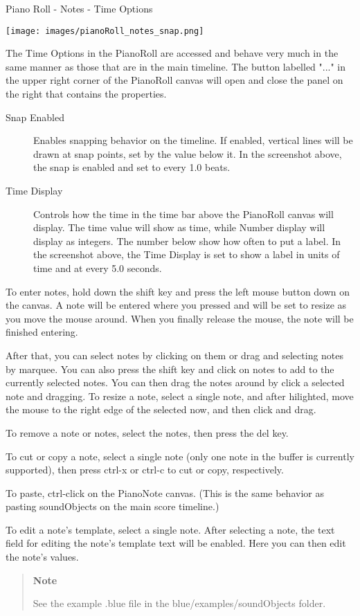 Piano Roll - Notes - Time Options

\texttt{[image: images/pianoRoll\_notes\_snap.png]}

The Time Options in the PianoRoll are accessed and behave very much in
the same manner as those that are in the main timeline. The button
labelled "..." in the upper right corner of the PianoRoll canvas will
open and close the panel on the right that contains the properties.

\begin{description}
\item[Snap Enabled]
Enables snapping behavior on the timeline. If enabled, vertical lines
will be drawn at snap points, set by the value below it. In the
screenshot above, the snap is enabled and set to every 1.0 beats.
\item[Time Display]
Controls how the time in the time bar above the PianoRoll canvas will
display. The time value will show as time, while Number display will
display as integers. The number below show how often to put a label. In
the screenshot above, the Time Display is set to show a label in units
of time and at every 5.0 seconds.
\end{description}

To enter notes, hold down the shift key and press the left mouse button
down on the canvas. A note will be entered where you pressed and will be
set to resize as you move the mouse around. When you finally release the
mouse, the note will be finished entering.

After that, you can select notes by clicking on them or drag and
selecting notes by marquee. You can also press the shift key and click
on notes to add to the currently selected notes. You can then drag the
notes around by click a selected note and dragging. To resize a note,
select a single note, and after hilighted, move the mouse to the right
edge of the selected now, and then click and drag.

To remove a note or notes, select the notes, then press the del key.

To cut or copy a note, select a single note (only one note in the buffer
is currently supported), then press ctrl-x or ctrl-c to cut or copy,
respectively.

To paste, ctrl-click on the PianoNote canvas. (This is the same behavior
as pasting soundObjects on the main score timeline.)

To edit a note's template, select a single note. After selecting a note,
the text field for editing the note's template text will be enabled.
Here you can then edit the note's values.

\begin{quote}
\textbf{Note}

See the example .blue file in the blue/examples/soundObjects folder.
\end{quote}
